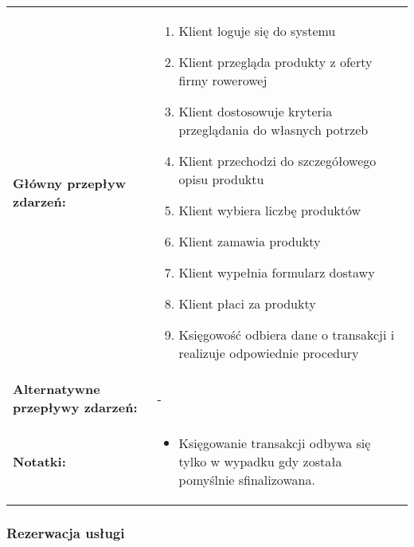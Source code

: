 \documentclass[a4paper,20pt]{article}
\begin{document}
\begin{center}
\begin{tabularx}{\textwidth}[t]{XX}
\quad \textbf{Główny przepływ zdarzeń:} & 
\begin{minipage}[t]{\linewidth}%
\begin{enumerate}
\item Klient loguje się do systemu
\item Klient przegląda produkty z oferty firmy rowerowej
\item Klient dostosowuje kryteria przeglądania do własnych potrzeb
\item Klient przechodzi do szczegółowego opisu produktu
\item Klient wybiera liczbę produktów
\item Klient zamawia produkty
\item Klient wypełnia formularz dostawy
\item Klient płaci za produkty
\item Księgowość odbiera dane o transakcji i realizuje odpowiednie procedury
\end{enumerate}
\end{minipage}\\


\quad \textbf{Alternatywne przepływy zdarzeń:} & 
\begin{minipage}[t]{\linewidth}%
-
\end{minipage}\\


\quad \textbf{Notatki:} & 
\begin{minipage}[t]{\linewidth}%
\begin{itemize}
\item Księgowanie transakcji odbywa się tylko w wypadku gdy została pomyślnie sfinalizowana. 
\end{itemize}
\end{minipage}\\


\end{tabularx}
\end{center}




\subsubsection{Rezerwacja usługi}
\end{document}
